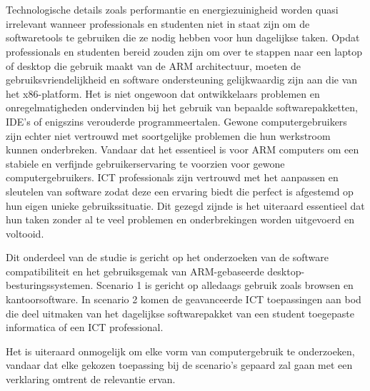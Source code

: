 
\chapter{}
\label{ch:methodologie}


Technologische details zoals performantie en energiezuinigheid worden quasi irrelevant wanneer professionals en studenten niet in staat zijn om de softwaretools te gebruiken die ze nodig hebben voor hun dagelijkse taken. Opdat professionals en studenten bereid zouden zijn om over te stappen naar een laptop of desktop die gebruik maakt van de ARM architectuur, moeten de gebruiksvriendelijkheid en software ondersteuning gelijkwaardig zijn aan die van het x86-platform. Het is niet ongewoon dat ontwikkelaars problemen en onregelmatigheden ondervinden bij het gebruik van bepaalde softwarepakketten, IDE’s of enigszins verouderde programmeertalen. Gewone computergebruikers zijn echter niet vertrouwd met soortgelijke problemen die hun werkstroom kunnen onderbreken. Vandaar dat het essentieel is voor ARM computers om een stabiele en verfijnde gebruikerservaring te voorzien voor gewone computergebruikers. ICT professionals zijn vertrouwd met het aanpassen en sleutelen van software zodat deze een ervaring biedt die perfect is afgestemd op hun eigen unieke gebruikssituatie. Dit gezegd zijnde is het uiteraard essentieel dat hun taken zonder al te veel problemen en onderbrekingen worden uitgevoerd en voltooid.

Dit onderdeel van de studie is gericht op het onderzoeken van de software compatibiliteit en het gebruiksgemak van ARM-gebaseerde desktop-besturingssystemen. Scenario 1 is gericht op alledaags gebruik zoals browsen en kantoorsoftware. In scenario 2 komen de geavanceerde ICT toepassingen aan bod die deel uitmaken van het dagelijkse softwarepakket van een student toegepaste informatica of een ICT professional.

Het is uiteraard onmogelijk om elke vorm van computergebruik te onderzoeken, vandaar dat elke gekozen toepassing bij de scenario’s gepaard zal gaan met een verklaring omtrent de relevantie ervan.

